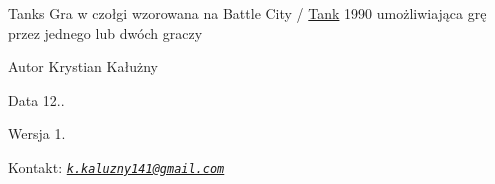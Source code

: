 \begin{DoxyParagraph}{Tanks}
Gra w czołgi wzorowana na Battle City / \hyperlink{class_tank}{Tank} 1990 umożliwiająca grę przez jednego lub dwóch graczy 
\end{DoxyParagraph}
\begin{DoxyAuthor}{Autor}
Krystian Kałużny 
\end{DoxyAuthor}
\begin{DoxyDate}{Data}
12.. 
\end{DoxyDate}
\begin{DoxyVersion}{Wersja}
1. 
\end{DoxyVersion}
\begin{DoxyParagraph}{Kontakt\+:}
{\itshape \href{mailto:k.kaluzny141@gmail.com}{\tt k.\+kaluzny141@gmail.\+com}} 
\end{DoxyParagraph}
